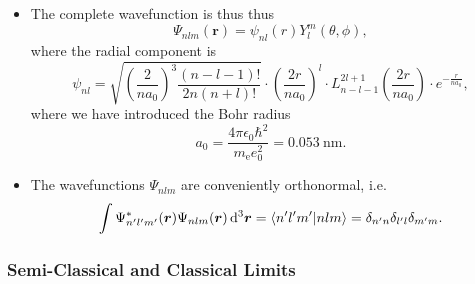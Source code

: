 \documentclass[11pt, a4paper]{article}
\newcommand{\diff}{\mathop{}\!\mathrm{d}} %
\newcommand{\dr}{\diff^{3} \r}  %
\renewcommand{\vec}[1]{\bm{#1}}  %
\renewcommand{\r}{\vec{r}}  %
\newcommand{\p}{\psi}  %
\renewcommand{\P}{\Psi}  %
\begin{document}
\begin{itemize}
	\item The complete wavefunction is thus thus
	\begin{equation*}
		\P_{nlm}(\r) = \p_{nl}(r)Y_{l}^{m}(\theta, \phi),
	\end{equation*}
	where the radial component is
	\begin{equation*}
		\p_{nl} = \sqrt{\left(\frac{2}{na_{0}}\right)^{3}\frac{(n - l - 1)!}{2n(n + l)!}}\cdot \left(\frac{2r}{na_{0}}\right)^{l}\cdot L_{n - l - 1}^{2l + 1} \left(\frac{2r}{na_{0}}\right)\cdot e^{-\frac{r}{na_{0}}},
	\end{equation*}
	where we have introduced the Bohr radius
	\begin{equation*}
		a_{0} = \frac{4\pi \epsilon_{0}\hbar^{2}}{m_{\text{e}} e_{0}^{2}} = \SI{0.053}{\nano \meter}.
	\end{equation*}
	
	\item The wavefunctions $ \P_{nlm} $ are conveniently orthonormal, i.e.
	\begin{equation*}
		\int \P^{*}_{n'l'm'}(\r)\P_{nlm}(\r)\dr = \braket{n'l'm'}{nlm} = \delta_{n'n}\delta_{l'l}\delta_{m'm}.
	\end{equation*}
\end{itemize}

\subsubsection{Semi-Classical and Classical Limits}
\end{document}
